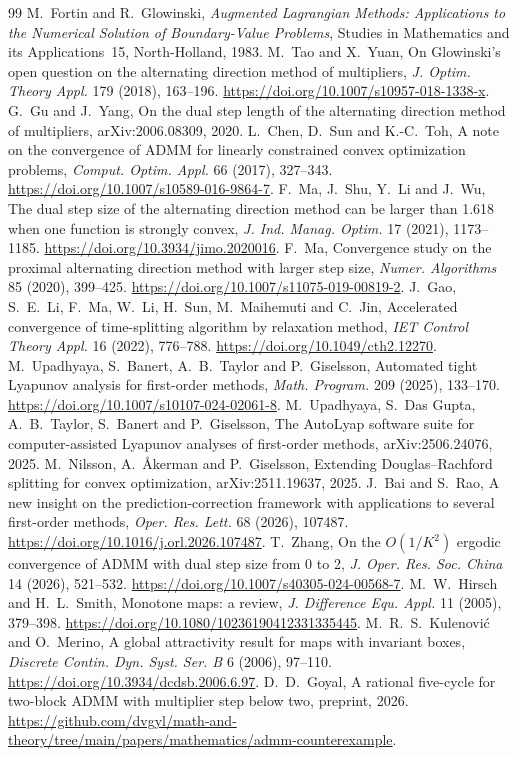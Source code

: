 \documentclass[11pt]{article}
\numberwithin{equation}{section}
\theoremstyle{definition}
\theoremstyle{remark}
\begin{document}
\begin{thebibliography}{99}
 M.~Fortin and R.~Glowinski, \emph{Augmented Lagrangian Methods: Applications to the Numerical Solution of Boundary-Value Problems}, Studies in Mathematics and its Applications~15, North-Holland, 1983.
 M.~Tao and X.~Yuan, On Glowinski's open question on the alternating direction method of multipliers, \emph{J. Optim. Theory Appl.} 179 (2018), 163--196. \url{https://doi.org/10.1007/s10957-018-1338-x}.
 G.~Gu and J.~Yang, On the dual step length of the alternating direction method of multipliers, arXiv:2006.08309, 2020.
 L.~Chen, D.~Sun and K.-C.~Toh, A note on the convergence of ADMM for linearly constrained convex optimization problems, \emph{Comput. Optim. Appl.} 66 (2017), 327--343. \url{https://doi.org/10.1007/s10589-016-9864-7}.
 F.~Ma, J.~Shu, Y.~Li and J.~Wu, The dual step size of the alternating direction method can be larger than 1.618 when one function is strongly convex, \emph{J. Ind. Manag. Optim.} 17 (2021), 1173--1185. \url{https://doi.org/10.3934/jimo.2020016}.
 F.~Ma, Convergence study on the proximal alternating direction method with larger step size, \emph{Numer. Algorithms} 85 (2020), 399--425. \url{https://doi.org/10.1007/s11075-019-00819-2}.
 J.~Gao, S.~E.~Li, F.~Ma, W.~Li, H.~Sun, M.~Maihemuti and C.~Jin, Accelerated convergence of time-splitting algorithm by relaxation method, \emph{IET Control Theory Appl.} 16 (2022), 776--788. \url{https://doi.org/10.1049/cth2.12270}.
 M.~Upadhyaya, S.~Banert, A.~B.~Taylor and P.~Giselsson, Automated tight Lyapunov analysis for first-order methods, \emph{Math. Program.} 209 (2025), 133--170. \url{https://doi.org/10.1007/s10107-024-02061-8}.
 M.~Upadhyaya, S.~Das Gupta, A.~B.~Taylor, S.~Banert and P.~Giselsson, The AutoLyap software suite for computer-assisted Lyapunov analyses of first-order methods, arXiv:2506.24076, 2025.
 M.~Nilsson, A.~\AA kerman and P.~Giselsson, Extending Douglas--Rachford splitting for convex optimization, arXiv:2511.19637, 2025.
 J.~Bai and S.~Rao, A new insight on the prediction-correction framework with applications to several first-order methods, \emph{Oper. Res. Lett.} 68 (2026), 107487. \url{https://doi.org/10.1016/j.orl.2026.107487}.
 T.~Zhang, On the $O(1/K^2)$ ergodic convergence of ADMM with dual step size from 0 to 2, \emph{J. Oper. Res. Soc. China} 14 (2026), 521--532. \url{https://doi.org/10.1007/s40305-024-00568-7}.
 M.~W.~Hirsch and H.~L.~Smith, Monotone maps: a review, \emph{J. Difference Equ. Appl.} 11 (2005), 379--398. \url{https://doi.org/10.1080/10236190412331335445}.
 M.~R.~S.~Kulenovi\'c and O.~Merino, A global attractivity result for maps with invariant boxes, \emph{Discrete Contin. Dyn. Syst. Ser. B} 6 (2006), 97--110. \url{https://doi.org/10.3934/dcdsb.2006.6.97}.
 D.~D.~Goyal, A rational five-cycle for two-block ADMM with multiplier step below two, preprint, 2026. \url{https://github.com/dvgyl/math-and-theory/tree/main/papers/mathematics/admm-counterexample}.
\end{thebibliography}
\end{document}

